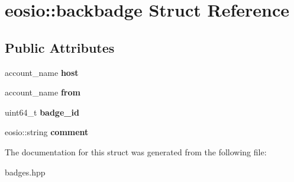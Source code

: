 \hypertarget{structeosio_1_1backbadge}{}\section{eosio\+:\+:backbadge Struct Reference}
\label{structeosio_1_1backbadge}
\subsection*{Public Attributes}
\begin{DoxyCompactItemize}
\item 
\mbox{\label{structeosio_1_1backbadge_a99dcddf14a170cac1f849d28b71d4f76}} 
account\+\_\+name {\bfseries host}
\item 
\mbox{\label{structeosio_1_1backbadge_afacb89cce1f3323007ed6a4e60ccdd19}} 
account\+\_\+name {\bfseries from}
\item 
\mbox{\label{structeosio_1_1backbadge_abd90ebcbd4af636b220dff0d38cb5ee6}} 
uint64\+\_\+t {\bfseries badge\+\_\+id}
\item 
\mbox{\label{structeosio_1_1backbadge_ad911838ee3124447394ac853646256d8}} 
eosio\+::string {\bfseries comment}
\end{DoxyCompactItemize}


The documentation for this struct was generated from the following file\+:\begin{DoxyCompactItemize}
\item 
badges.\+hpp\end{DoxyCompactItemize}
